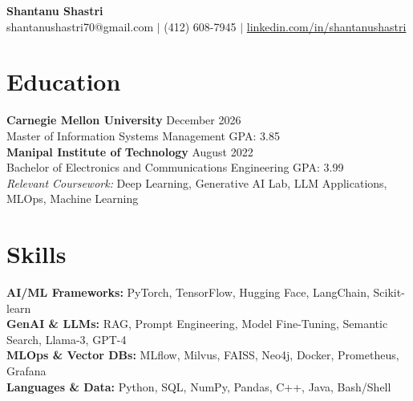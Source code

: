 \documentclass[11pt,a4paper]{article}
\begin{document}
\begin{center}
    \Huge \textbf{Shantanu Shastri} \\
    \vspace{2pt}
    \small shantanushastri70@gmail.com $|$ (412) 608-7945 $|$ \href{https://linkedin.com/in/shantanushastri}{linkedin.com/in/shantanushastri}
\end{center}

\vspace{-5pt}
\section{Education}
\noindent
\textbf{Carnegie Mellon University} \hfill December 2026 \\
Master of Information Systems Management \hfill GPA: 3.85 \\
\textbf{Manipal Institute of Technology} \hfill August 2022 \\
Bachelor of Electronics and Communications Engineering \hfill GPA: 3.99 \\
\textit{Relevant Coursework:} Deep Learning, Generative AI Lab, LLM Applications, MLOps, Machine Learning

\vspace{-5pt}
\section{Skills}
\noindent
\textbf{AI/ML Frameworks:} PyTorch, TensorFlow, Hugging Face, LangChain, Scikit-learn \\
\textbf{GenAI \& LLMs:} RAG, Prompt Engineering, Model Fine-Tuning, Semantic Search, Llama-3, GPT-4 \\
\textbf{MLOps \& Vector DBs:} MLflow, Milvus, FAISS, Neo4j, Docker, Prometheus, Grafana \\
\textbf{Languages \& Data:} Python, SQL, NumPy, Pandas, C++, Java, Bash/Shell

\vspace{-5pt}
\end{document}
